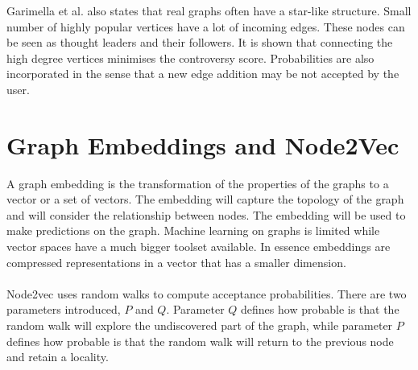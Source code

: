 \noindent Garimella et al. also states that real graphs often have a star-like structure. Small number of highly popular vertices have a lot of incoming edges. These nodes can be seen as thought leaders and their followers. It is shown that connecting the high degree vertices minimises the controversy score. Probabilities are also incorporated in the sense that a new edge addition may be not accepted by the user.

\section{Graph Embeddings and Node2Vec}		
\label{sec:embeddings}		

A graph embedding \cite{Leskovec} is the transformation of the properties of the graphs to a vector or a set of vectors. The embedding will capture the topology of the graph and will consider the relationship between nodes. The embedding will be used to make predictions on the graph. Machine learning on graphs is limited while vector spaces have a much bigger toolset available. In essence embeddings are compressed representations in a vector that has a smaller dimension.		
\\
\\
Node2vec uses random walks to compute acceptance probabilities. There are two parameters introduced, $P$ and $Q$. Parameter $Q$ defines how probable is that the random walk will explore the undiscovered part of the graph, while parameter $P$ defines how probable is that the random walk will return to the previous node and retain a locality.
